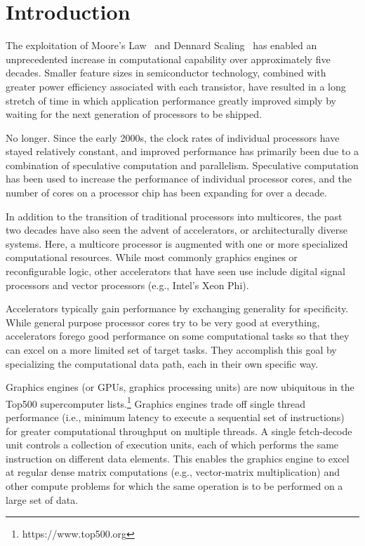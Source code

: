 \section{Introduction}
\label{sec:intro}

The exploitation of Moore's Law~\cite{Moore65,Mack11}
and Dennard Scaling~\cite{Dennard74,Bohr07}
has enabled an unprecedented increase in computational capability over 
approximately five decades. Smaller feature sizes in semiconductor
technology, combined with greater power efficiency associated with each
transistor, have resulted in a long stretch of time in which application
performance greatly improved simply by waiting for the next generation
of processors to be shipped.

No longer. Since the early 2000s, the clock rates of individual processors
have stayed relatively constant, and improved performance has primarily
been due to a combination of speculative computation and parallelism.
Speculative computation has been used to increase the performance of
individual processor cores, and the number of cores on a processor chip
has been expanding for over a decade.

In addition to the transition of traditional processors into multicores,
the past two decades have also seen the advent of accelerators, or
architecturally diverse systems.  Here, a multicore processor is augmented
with one or more specialized computational resources.  While most
commonly graphics engines or reconfigurable logic, other accelerators
that have seen use include digital signal processors
and vector processors (e.g., Intel's Xeon Phi).

Accelerators typically gain performance by exchanging generality for
specificity. While general purpose processor cores try to be very good
at everything, accelerators forego good performance on some computational
tasks so that they can excel on a more limited set of target tasks.
They accomplish this goal by specializing the computational data path,
each in their own specific way.

Graphics engines (or GPUs, graphics processing units) are now ubiquitous
in the Top500 supercomputer lists.\footnote{https://www.top500.org}
Graphics engines trade off single thread performance (i.e., minimum latency
to execute a sequential set of instructions) for greater computational
throughput on multiple threads.  A single fetch-decode unit controls a
collection of execution units, each of which performs the same instruction
on different data elements.  This enables the graphics engine to excel
at regular dense matrix computations (e.g., vector-matrix multiplication)
and other compute problems for which the same operation is to be performed
on a large set of data.

